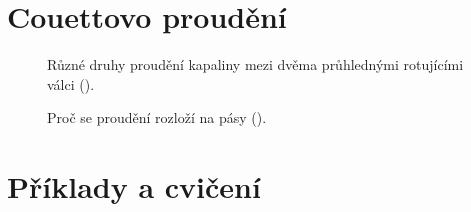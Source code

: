   \section{Couettovo proudění}\label{fyz:IIchapXLIsecVI}

    \begin{figure}[hb!] %
      \centering
      \caption{Různé druhy proudění kapaliny mezi dvěma průhlednými rotujícími válci
               (\cite[s.~770]{Feynman02}).}
      \label{fyz:fig542}
    \end{figure}
  
    \begin{figure}[hb!] %
      \centering
        \newline
      \caption{Proč se proudění rozloží na pásy
               (\cite[s.~770]{Feynman02}).}
      \label{fyz:fig543}
    \end{figure}

  \section{Příklady a cvičení}\label{fyz:IIchapXLIsecVII}


